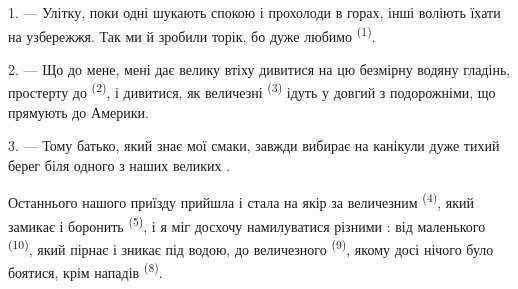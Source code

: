 %
%

\VUsaut{4.0mm}
\VUsaut{3.0mm}
\VUsaut{3.0mm}

1. --- Улітку, поки одні шукають спокою і прохолоди в горах, інші воліють їхати
на узбережжя. Так ми й зробили торік, бо дуже любимо 
\textsuperscript{(1)}.

2. --- Що до мене, мені дає велику втіху дивитися на цю безмірну водяну
гладінь, простерту до  \textsuperscript{(2)}, і дивитися, як
величезні  \textsuperscript{(3)} ідуть у довгий  з
подорожніми, що прямують до Америки.

3. --- Тому батько, який знає мої смаки, завжди вибирає на канікули дуже тихий
берег біля одного з наших великих .

Останнього нашого приїзду  прийшла і стала на якір за величезним
 \textsuperscript{(4)}, який замикає і боронить  \textsuperscript{(5)}, і я міг досхочу намилуватися різними
: від маленького 
\textsuperscript{(10)}, який пірнає і зникає під водою, до величезного
 \textsuperscript{(9)}, якому досі нічого було боятися, крім
нападів  \textsuperscript{(8)}.

